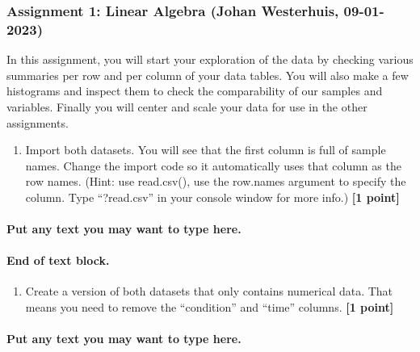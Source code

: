 \documentclass[
]{article}
\providecommand{\tightlist}{%
  \setlength{\itemsep}{0pt}\setlength{\parskip}{0pt}}
\begin{document}
\hypertarget{assignment-1-linear-algebra-johan-westerhuis-09-01-2023}{%
\subsubsection{Assignment 1: Linear Algebra (Johan Westerhuis,
09-01-2023)}\label{assignment-1-linear-algebra-johan-westerhuis-09-01-2023}}

In this assignment, you will start your exploration of the data by
checking various summaries per row and per column of your data tables.
You will also make a few histograms and inspect them to check the
comparability of our samples and variables. Finally you will center and
scale your data for use in the other assignments.

\begin{enumerate}
\def\labelenumi{\Alph{enumi})}
\tightlist
\item
  Import both datasets. You will see that the first column is full of
  sample names. Change the import code so it automatically uses that
  column as the row names. (Hint: use read.csv(), use the row.names
  argument to specify the column. Type ``?read.csv'' in your console
  window for more info.) \textbf{{[}1 point{]}}
\end{enumerate}

\hypertarget{put-any-text-you-may-want-to-type-here.}{%
\paragraph{Put any text you may want to type
here.}\label{put-any-text-you-may-want-to-type-here.}}

\hypertarget{end-of-text-block.-1}{%
\paragraph{End of text block.}\label{end-of-text-block.-1}}

\begin{enumerate}
\def\labelenumi{\Alph{enumi})}
\setcounter{enumi}{1}
\tightlist
\item
  Create a version of both datasets that only contains numerical data.
  That means you need to remove the ``condition'' and ``time'' columns.
  \textbf{{[}1 point{]}}
\end{enumerate}

\hypertarget{put-any-text-you-may-want-to-type-here.-1}{%
\paragraph{Put any text you may want to type
here.}\label{put-any-text-you-may-want-to-type-here.-1}}
\end{document}

